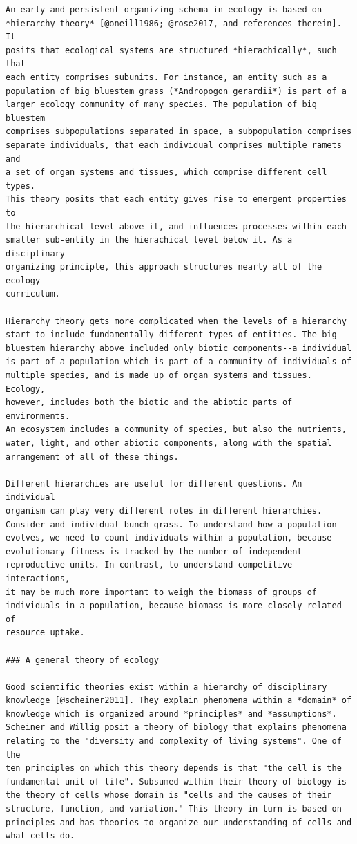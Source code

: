 \documentclass[
  10pt,
  letterpaper,
  nols]{tufte-book}
\begin{document}
\begin{verbatim}
An early and persistent organizing schema in ecology is based on
*hierarchy theory* [@oneill1986; @rose2017, and references therein]. It
posits that ecological systems are structured *hierachically*, such that
each entity comprises subunits. For instance, an entity such as a
population of big bluestem grass (*Andropogon gerardii*) is part of a
larger ecology community of many species. The population of big bluestem
comprises subpopulations separated in space, a subpopulation comprises
separate individuals, that each individual comprises multiple ramets and
a set of organ systems and tissues, which comprise different cell types.
This theory posits that each entity gives rise to emergent properties to
the hierarchical level above it, and influences processes within each
smaller sub-entity in the hierachical level below it. As a disciplinary
organizing principle, this approach structures nearly all of the ecology
curriculum.

Hierarchy theory gets more complicated when the levels of a hierarchy
start to include fundamentally different types of entities. The big
bluestem hierarchy above included only biotic components--a individual
is part of a population which is part of a community of individuals of
multiple species, and is made up of organ systems and tissues. Ecology,
however, includes both the biotic and the abiotic parts of environments.
An ecosystem includes a community of species, but also the nutrients,
water, light, and other abiotic components, along with the spatial
arrangement of all of these things.

Different hierarchies are useful for different questions. An individual
organism can play very different roles in different hierarchies.
Consider and individual bunch grass. To understand how a population
evolves, we need to count individuals within a population, because
evolutionary fitness is tracked by the number of independent
reproductive units. In contrast, to understand competitive interactions,
it may be much more important to weigh the biomass of groups of
individuals in a population, because biomass is more closely related of
resource uptake.

### A general theory of ecology

Good scientific theories exist within a hierarchy of disciplinary
knowledge [@scheiner2011]. They explain phenomena within a *domain* of
knowledge which is organized around *principles* and *assumptions*.
Scheiner and Willig posit a theory of biology that explains phenomena
relating to the "diversity and complexity of living systems". One of the
ten principles on which this theory depends is that "the cell is the
fundamental unit of life". Subsumed within their theory of biology is
the theory of cells whose domain is "cells and the causes of their
structure, function, and variation." This theory in turn is based on
principles and has theories to organize our understanding of cells and
what cells do.


\end{verbatim}
\end{document}
